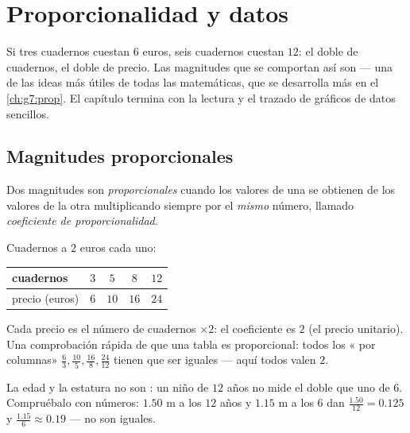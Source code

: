 \chapter{Proporcionalidad y datos}\label{ch:g6:propdata}

Si tres cuadernos cuestan $6$ euros, seis cuadernos cuestan $12$: el doble de
cuadernos, el doble de precio. Las magnitudes que se comportan así son
\emph{} --- una de las ideas más útiles de todas las
matemáticas, que se desarrolla más en el \cref{ch:g7:prop}. El capítulo termina
con la lectura y el trazado de gráficos de datos sencillos.

\section{Magnitudes proporcionales}

\begin{definition}[Proporcionalidad]\label{def:g6:propdata:def}
Dos magnitudes son \emph{proporcionales} cuando los
valores de una se obtienen de los valores de la otra multiplicando
siempre por el \emph{mismo} número, llamado \emph{coeficiente de
proporcionalidad}.
\end{definition}

\begin{example}\label{ex:g6:propdata:table}
Cuadernos a $2$ euros cada uno:
\begin{center}
\renewcommand{\arraystretch}{1.3}
\begin{tabular}{l|cccc}
cuadernos & $3$ & $5$ & $8$ & $12$ \\
\hline
precio (euros) & $6$ & $10$ & $16$ & $24$ \\
\end{tabular}
\end{center}
Cada precio es el número de cuadernos $\times 2$: el coeficiente es
$2$ (el precio unitario). Una comprobación rápida de que una tabla es proporcional:
todos los « por columnas» $\frac{6}{3}, \frac{10}{5}, \frac{16}{8},
\frac{24}{12}$ tienen que ser iguales --- aquí todos valen $2$.
\end{example}

\begin{example}[Un contraejemplo]\label{ex:g6:propdata:nonexample}
La edad y la estatura no son : un niño de $12$ años no mide el doble
que uno de $6$. Compruébalo con números: $1.50$ m a los $12$ años y
$1.15$ m a los $6$ dan  $\frac{1.50}{12} = 0.125$ y
$\frac{1.15}{6} \approx 0.19$ --- no son iguales.
\end{example}

